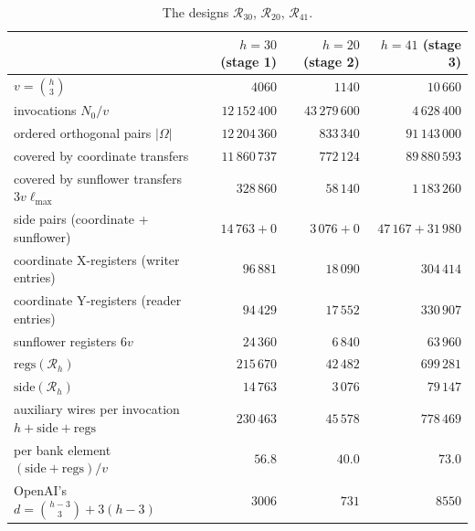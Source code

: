 \begin{table}[ht]\centering\small
\begin{tabular}{@{}l r r r@{}}
\toprule
 & $h=30$ (stage 1) & $h=20$ (stage 2) & $h=41$ (stage 3)\\
\midrule
$v=\binom h3$ & $4060$ & $1140$ & $10\,660$\\
invocations $N_0/v$ & $12\,152\,400$ & $43\,279\,600$ & $4\,628\,400$\\
ordered orthogonal pairs $|\Omega|$ & $12\,204\,360$ & $833\,340$ & $91\,143\,000$\\
\quad covered by coordinate transfers & $11\,860\,737$ & $772\,124$ & $89\,880\,593$\\
\quad covered by sunflower transfers $3v\ell_{\max}$ & $328\,860$ & $58\,140$ & $1\,183\,260$\\
\quad side pairs (coordinate + sunflower) & $14\,763+0$ & $3\,076+0$ & $47\,167+31\,980$\\
coordinate X-registers (writer entries) & $96\,881$ & $18\,090$ & $304\,414$\\
coordinate Y-registers (reader entries) & $94\,429$ & $17\,552$ & $330\,907$\\
sunflower registers $6v$ & $24\,360$ & $6\,840$ & $63\,960$\\
$\mathrm{regs}(\mathcal R_h)$ & $215\,670$ & $42\,482$ & $699\,281$\\
$\mathrm{side}(\mathcal R_h)$ & $14\,763$ & $3\,076$ & $79\,147$\\
auxiliary wires per invocation $h+\mathrm{side}+\mathrm{regs}$ & $230\,463$ & $45\,578$ & $778\,469$\\
per bank element $(\mathrm{side}+\mathrm{regs})/v$ & $56.8$ & $40.0$ & $73.0$\\
OpenAI's $d=\binom{h-3}3+3(h-3)$ & $3006$ & $731$ & $8550$\\
\bottomrule
\end{tabular}
\caption{The designs $\mathcal R_{30}$, $\mathcal R_{20}$, $\mathcal R_{41}$.}\label{col:tab:designs}
\end{table}

